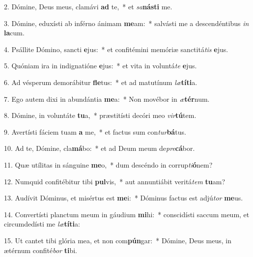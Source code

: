 2. Dómine, Deus meus, clamávi \textbf{ad} te,~*  et \textit{sa}\textbf{nás}\textbf{ti} me.\

3. Dómine, eduxísti ab inférno ánimam \textbf{me}am:~*  salvásti me a descendéntibus \textit{in} \textbf{la}cum.\

4. Psállite Dómino, sancti \textbf{e}jus:~*  et confitémini memóriæ sanctitá\textit{tis} \textbf{e}jus.\

5. Quóniam ira in indignatióne \textbf{e}jus:~*  et vita in voluntá\textit{te} \textbf{e}jus.\

6. Ad vésperum demorábitur \textbf{fle}tus:~*  et ad matutínum \textit{læ}\textbf{tí}\textbf{ti}a.\

7. Ego autem dixi in abundántia \textbf{me}a:~*  Non movébor in \textit{æ}\textbf{tér}num.\

8. Dómine, in voluntáte \textbf{tu}a,~*  præstitísti decóri meo \textit{vir}\textbf{tú}tem.\

9. Avertísti fáciem tuam \textbf{a} me,~*  et factus sum con\textit{tur}\textbf{bá}tus.\

10. Ad te, Dómine, cla\textbf{má}bo:~*  et ad Deum meum de\textit{pre}\textbf{cá}bor.\

11. Quæ utílitas in sánguine \textbf{me}o,~*  dum descéndo in corrup\textit{ti}\textbf{ó}nem?\

12. Numquid confitébitur tibi \textbf{pul}vis,~*  aut annuntiábit veritá\textit{tem} \textbf{tu}am?\

13. Audívit Dóminus, et misértus est \textbf{me}i:~*  Dóminus factus est adjú\textit{tor} \textbf{me}us.\

14. Convertísti planctum meum in gáudium \textbf{mi}hi:~*  conscidísti saccum meum, et circumdedísti me \textit{læ}\textbf{tí}\textbf{ti}a:\

15. Ut cantet tibi glória mea, et non com\textbf{pún}gar:~*  Dómine, Deus meus, in ætérnum confité\textit{bor} \textbf{ti}bi.\

